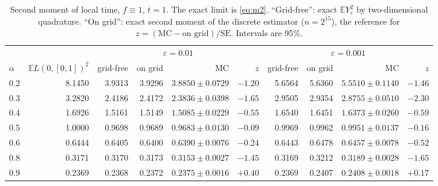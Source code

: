 \documentclass[11pt]{article}
\theoremstyle{remark}
\theoremstyle{definition}
\newcommand{\E}{\mathbb{E}}
\begin{document}
\begin{table}[t]
\centering\footnotesize
\setlength{\tabcolsep}{3pt}
\begin{tabular}{@{}lrrrrrrrrr@{}}
\toprule
 & & \multicolumn{4}{c}{$\varepsilon=0.01$} & \multicolumn{4}{c}{$\varepsilon=0.001$}\\
\cmidrule(lr){3-6}\cmidrule(l){7-10}
$\alpha$ & $\E L(0,[0,1])^2$ & grid-free & on grid & MC & $z$ & grid-free & on grid & MC & $z$\\
\midrule
0.2 & 8.1450 & 3.9313 & 3.9296 & $3.8850\pm0.0729$ & $-1.20$ & 5.6564 & 5.6360 & $5.5510\pm0.1140$ & $-1.46$\\
0.3 & 3.2820 & 2.4186 & 2.4172 & $2.3836\pm0.0398$ & $-1.65$ & 2.9505 & 2.9354 & $2.8755\pm0.0510$ & $-2.30$\\
0.4 & 1.6926 & 1.5161 & 1.5149 & $1.5085\pm0.0229$ & $-0.55$ & 1.6540 & 1.6451 & $1.6373\pm0.0260$ & $-0.59$\\
0.5 & 1.0000 & 0.9698 & 0.9689 & $0.9683\pm0.0130$ & $-0.09$ & 0.9969 & 0.9962 & $0.9951\pm0.0137$ & $-0.16$\\
0.6 & 0.6444 & 0.6405 & 0.6400 & $0.6390\pm0.0076$ & $-0.24$ & 0.6443 & 0.6478 & $0.6457\pm0.0078$ & $-0.52$\\
0.8 & 0.3171 & 0.3170 & 0.3173 & $0.3153\pm0.0027$ & $-1.45$ & 0.3169 & 0.3212 & $0.3189\pm0.0028$ & $-1.65$\\
0.9 & 0.2369 & 0.2368 & 0.2372 & $0.2375\pm0.0016$ & $+0.40$ & 0.2369 & 0.2407 & $0.2408\pm0.0018$ & $+0.17$\\
\bottomrule
\end{tabular}
\caption{Second moment of local time, $f\equiv1$, $t=1$. The exact limit is \eqref{eq:m2}. ``Grid-free'': exact $\E Y_\varepsilon^2$ by two-dimensional quadrature. ``On grid'': exact second moment of the discrete estimator ($n=2^{15}$), the reference for $z=(\text{MC}-\text{on grid})/\mathrm{SE}$. Intervals are 95\%.}
\label{tab:m2}
\end{table}
\end{document}
